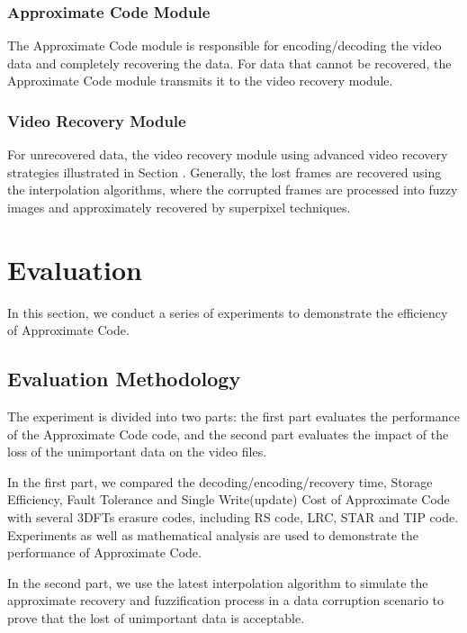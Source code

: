 \documentclass[sigconf]{acmart}
\begin{document}
\subsubsection{Approximate Code Module}
The Approximate Code module is responsible for encoding/decoding the video data and completely recovering the data. For data that cannot be recovered, the Approximate Code module transmits it to the video recovery module.

\subsubsection{Video Recovery Module}
For unrecovered data, the video recovery module using advanced video recovery strategies illustrated in Section \label{video storage}. Generally, the lost frames are recovered using the interpolation algorithms, where the corrupted frames are processed into fuzzy images and approximately recovered by superpixel techniques.


\section{Evaluation}\label{evaluation}
In this section, we conduct a series of experiments to demonstrate the efficiency of Approximate Code.
\subsection{Evaluation Methodology}
The experiment is divided into two parts: the first part evaluates the performance of the Approximate Code code, and the second part evaluates the impact of the loss of the unimportant data on the video files.

In the first part, we compared the decoding/encoding/recovery time, Storage Efficiency, Fault Tolerance and Single Write(update) Cost of Approximate Code with several 3DFTs erasure codes, including RS code, LRC, STAR and TIP code. Experiments as well as mathematical analysis are used to demonstrate the performance of Approximate Code.

In the second part, we use the latest interpolation algorithm to simulate the approximate recovery and fuzzification process in a data corruption scenario to prove that the lost of unimportant data is acceptable.
\end{document}
